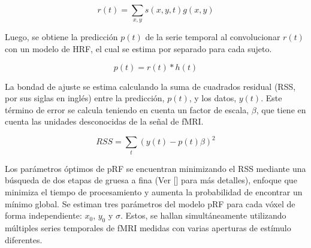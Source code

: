 \begin{equation}
	r(t)=\sum_{x,y}s(x,y,t)g(x,y)
\end{equation}

Luego, se obtiene la predicción $p(t)$ de la serie temporal al convolucionar $r(t)$ con un modelo de HRF, el cual se estima por separado para cada sujeto.

\begin{equation}
	p(t) = r(t) * h(t)
\end{equation}

La bondad de ajuste se estima calculando la suma de cuadrados residual (RSS, por sus siglas en ingl\'es) entre la predicción, $p(t)$, y los datos, $y(t)$. Este término de error se calcula teniendo en cuenta un factor de escala, $\beta$, que tiene en cuenta las unidades desconocidas de la señal de fMRI.

\begin{equation}
	RSS = \sum_{t}(y(t)-p(t)\beta)^2
\end{equation}

Los parámetros óptimos de pRF se encuentran minimizando el RSS mediante una búsqueda de dos etapas de gruesa a fina (Ver [\cite{dumoulin_population_2008}] para m\'as detalles), enfoque que minimiza el tiempo de procesamiento y aumenta la probabilidad de encontrar un mínimo global. Se estiman tres parámetros del modelo pRF para cada vóxel de forma independiente: $x_0$, $y_0$ y $\sigma$. Estos, se hallan simultáneamente utilizando múltiples series temporales de fMRI medidas con varias aperturas de estímulo diferentes.

